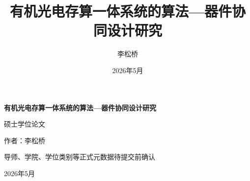 \documentclass[12pt,a4paper]{ctexbook}
\title{\textbf{有机光电存算一体系统的算法—器件协同设计研究}}
\author{李松桥}
\date{2026年5月}
\theoremstyle{definition}
\begin{document}
\begin{titlepage}
    \centering
    \vspace*{2cm}
    {\bfseries 有机光电存算一体系统的算法—器件协同设计研究\par}
    \vspace{3cm}
    { 硕士学位论文\par}
    \vspace{1cm}
    { 作者：李松桥\par}
    \vspace{0.5cm}
    { 导师、学院、学位类别等正式元数据待提交前确认\par}
    \vspace{2cm}
    { 2026年5月\par}
\end{titlepage}

\frontmatter


\tableofcontents

\mainmatter











\end{document}
